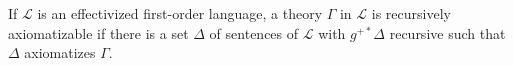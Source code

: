 If $\mathcal{L}$ is an effectivized first-order language, a theory $\Gamma$ in $\mathcal{L}$ is recursively axiomatizable if there is a set $\Delta$ of sentences of $\mathcal{L}$ with $g^{+*} \Delta$ recursive such that $\Delta$ axiomatizes $\Gamma$.
